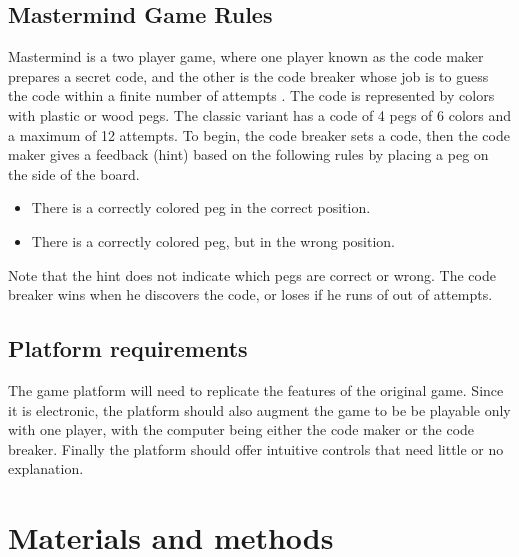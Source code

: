 \documentclass[a4paper, 12pt]{article}
\begin{document}
\subsection{Mastermind Game Rules}
Mastermind is a two player game, where one player known as the code
maker prepares a secret code, and the other is the code breaker whose
job is to guess the code within a finite number of attempts \cite{wikistatemachine}. The code is
represented by colors with plastic or wood pegs. The classic variant has
a code of 4 pegs of 6 colors and a maximum of 12 attempts. To begin, the
code breaker sets a code, then the code maker gives a feedback (hint)
based on the following rules by placing a peg on the side of the board.

\begin{itemize}
    \item There is a correctly colored peg in the correct position.
    \item There is a correctly colored peg, but in the wrong position.
\end{itemize}

Note that the hint does not indicate which pegs are correct or wrong.
The code breaker wins when he discovers the code, or loses if he runs of
out of attempts.

\subsection{Platform requirements}
The game platform will need to replicate the features of the original
game. Since it is electronic, the platform should also augment the game
to be be playable only with one player, with the computer being either
the code maker or the code breaker. Finally the platform should offer
intuitive controls that need little or no explanation.

\section{Materials and methods}
\end{document}
